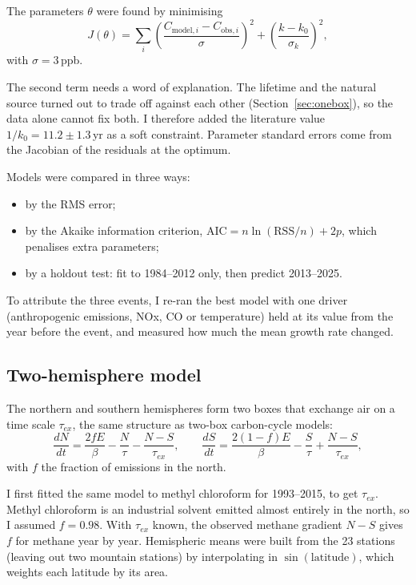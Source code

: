 \documentclass[11pt,a4paper]{article}
\begin{document}
The parameters $\theta$ were found by minimising
\begin{equation}
J(\theta)=\sum_{i}\left(\frac{C_{\mathrm{model},i}-C_{\mathrm{obs},i}}{\sigma}\right)^2+\left(\frac{k-k_0}{\sigma_k}\right)^2,
\end{equation}
with $\sigma=3$\,ppb.

The second term needs a word of explanation. The lifetime and the natural source turned out to trade off against each other (Section~\ref{sec:onebox}), so the data alone cannot fix both. I therefore added the literature value $1/k_0=11.2\pm1.3$\,yr as a soft constraint. Parameter standard errors come from the Jacobian of the residuals at the optimum.

Models were compared in three ways:
\begin{itemize}\itemsep0pt
\item by the RMS error;
\item by the Akaike information criterion, $\mathrm{AIC}=n\ln(\mathrm{RSS}/n)+2p$, which penalises extra parameters;
\item by a holdout test: fit to 1984--2012 only, then predict 2013--2025.
\end{itemize}
To attribute the three events, I re-ran the best model with one driver (anthropogenic emissions, NOx, CO or temperature) held at its value from the year before the event, and measured how much the mean growth rate changed.

\subsection{Two-hemisphere model}
The northern and southern hemispheres form two boxes that exchange air on a time scale $\tau_{ex}$, the same structure as two-box carbon-cycle models:
\begin{equation}
\frac{dN}{dt}=\frac{2fE}{\beta}-\frac{N}{\tau}-\frac{N-S}{\tau_{ex}},\qquad
\frac{dS}{dt}=\frac{2(1-f)E}{\beta}-\frac{S}{\tau}+\frac{N-S}{\tau_{ex}},
\label{eq:hemi}
\end{equation}
with $f$ the fraction of emissions in the north.

I first fitted the same model to methyl chloroform for 1993--2015, to get $\tau_{ex}$. Methyl chloroform is an industrial solvent emitted almost entirely in the north, so I assumed $f=0.98$. With $\tau_{ex}$ known, the observed methane gradient $N-S$ gives $f$ for methane year by year. Hemispheric means were built from the 23 stations (leaving out two mountain stations) by interpolating in $\sin(\text{latitude})$, which weights each latitude by its area.
\end{document}
